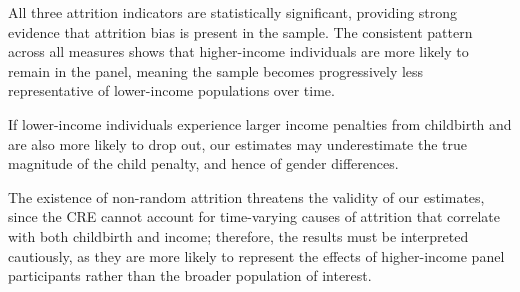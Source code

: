 All three attrition indicators are statistically significant, providing strong evidence that attrition bias is present in the sample. The consistent pattern across all measures shows that higher-income individuals are more likely to remain in the panel, meaning the sample becomes progressively less representative of lower-income populations over time. 

If lower-income individuals experience larger income penalties from childbirth and are also more likely to drop out, our estimates may underestimate the true magnitude of the child penalty, and hence of gender differences.

The existence of non-random attrition threatens the validity of our estimates, since the CRE cannot account for time-varying causes of attrition that correlate with both childbirth and income; therefore, the results must be interpreted cautiously, as they are more likely to represent the effects of higher-income panel participants rather than the broader population of interest.